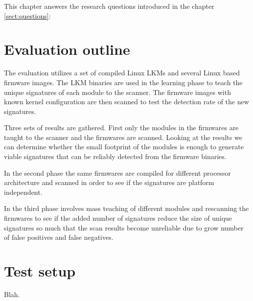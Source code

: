 
This chapter answers the research questions introduced in the chapter \ref{sect:questions}:



\section{Evaluation outline}

The evaluation utilizes a set of compiled Linux LKMs and several Linux based firmware images. The
LKM binaries are used in the learning phase to teach the unique signatures of each module to the
scanner. The firmware images with known kernel configuration are then scanned to test the detection
rate of the new signatures.

Three sets of results are gathered. First only the modules in the firmwares are taught to the
scanner and the firmwares are scanned. Looking at the results we can determine whether the small
footprint of the modules is enough to generate viable signatures that can be reliably detected from
the firmware binaries.

In the second phase the same firmwares are compiled for different processor architecture and
scanned in order to see if the signatures are platform independent.

In the third phase involves mass teaching of different modules and rescanning the firmwares to see
if the added number of signatures reduce the size of unique signatures so much that the scan
results become unreliable due to grow number of false positives and false negatives.

\section{Test setup}

Blah.
